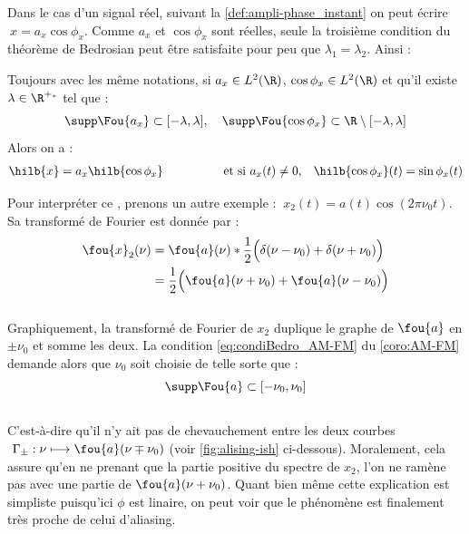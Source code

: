Dans le cas d'un signal réel, suivant la \cref{def:ampli-phase_instant} on peut écrire $\ x=a_x\cos \phi_x$.
Comme $a_x$ et $\cos \phi_x$ sont réelles, seule la troisième condition du théorème de Bedrosian peut être satisfaite pour peu que $\lambda_1=\lambda_2$. Ainsi :

\begin{corollaire}\label{coro:AM-FM}
	Toujours avec les même notations, si $a_x\in L^2(\R)$, $\cos\phi_x\in L^2(\R)$ et qu'il existe $\lambda\in\R^{+_*}$ tel que :
	\begin{equation}\label{eq:condiBedro_AM-FM}
		\supp \Fou{a_x} \subset [-\lambda, \lambda],\quad \supp \Fou{\cos\phi_x} \subset \R\setminus[-\lambda,\lambda]
	\end{equation}
	Alors on a :
	\begin{align}\label{eq:result_AM-FM}
		\hilb{x} &= a_x\hilb{\cos \phi_x}  &  \qquad\qquad&\text{et si }a_x(t)\neq 0,  &  \hilb{\cos \phi_x}(t) = \sin\phi_x(t)
	\end{align}
\end{corollaire}
\skipl

Pour interpréter ce , prenons un autre exemple : $\ x_2(t) = a(t)\cos(2\pi \nu_0 t)$. Sa transformé de Fourier est donnée par :
\begin{align*}
	\fou{x}_2(\nu) &= \fou{a}(\nu)*\frac{1}{2}\Big(\delta(\nu-\nu_0) + \delta(\nu+\nu_0)\Big) \\
	&= \frac{1}{2}\Big(\fou{a}(\nu+\nu_0) + \fou{a}(\nu-\nu_0)\Big)
\end{align*}
\\
Graphiquement, la transformé de Fourier de $x_2$ duplique le graphe de $\fou{a}$ en $\pm\nu_0$ et somme les deux. La condition \eqref{eq:condiBedro_AM-FM} du \cref{coro:AM-FM} demande alors que $\nu_0$ soit choisie de telle sorte que :
\[\supp \Fou{a}\subset[-\nu_0, \nu_0]\]
\\
C'est-à-dire qu'il n'y ait pas de chevauchement entre les deux courbes $\ \Gamma_\pm : \nu \longmapsto \fou{a}(\nu\mp\nu_0) $ (voir \cref{fig:alising-ish} ci-dessous). Moralement, cela assure qu'en ne prenant que la partie positive du spectre de $x_2$, l'on ne ramène pas avec une partie de $\fou{a}(\nu+\nu_0)$. Quant bien même cette explication est simpliste puisqu'ici $\phi$ est linaire, on peut voir que le phénomène est finalement très proche de celui d'aliasing.
\\

